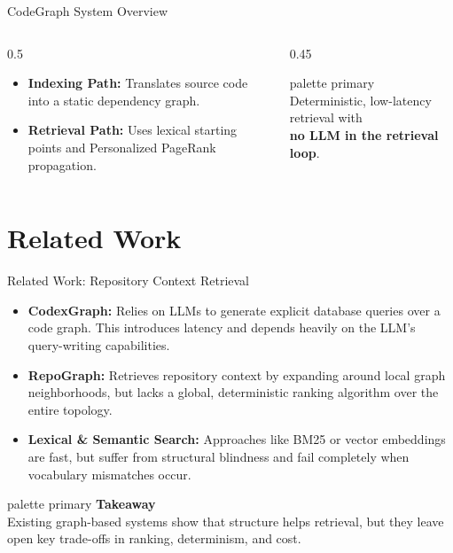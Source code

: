 \documentclass[aspectratio=169]{beamer}
\begin{document}
\begin{frame}{CodeGraph System Overview}
  \vspace{0.5cm}
  \begin{columns}[c]
    \begin{column}{0.5\textwidth}
      \begin{itemize}
        \item \textbf{Indexing Path:} Translates source code into a static dependency graph.
        \item \textbf{Retrieval Path:} Uses lexical starting points and Personalized PageRank propagation.
      \end{itemize}
    \end{column}
    \begin{column}{0.45\textwidth}
      \begin{beamercolorbox}[rounded=true, shadow=true, sep=6pt, center]{palette primary}
        Deterministic, low-latency retrieval with\\ \textbf{no LLM in the retrieval loop}.
      \end{beamercolorbox}
    \end{column}
  \end{columns}
\end{frame}



\section{Related Work}
\begin{frame}{Related Work: Repository Context Retrieval}
  \vspace{0.4cm}
  \begin{itemize}
    \setlength\itemsep{0.6em}
    \item \textbf{CodexGraph:} Relies on LLMs to generate explicit database queries over a code graph. This introduces latency and depends heavily on the LLM's query-writing capabilities.
    \item \textbf{RepoGraph:} Retrieves repository context by expanding around local graph neighborhoods, but lacks a global, deterministic ranking algorithm over the entire topology.
    \item \textbf{Lexical \& Semantic Search:} Approaches like BM25 or vector embeddings are fast, but suffer from structural blindness and fail completely when vocabulary mismatches occur.
  \end{itemize}

  \vspace{0.4cm}
  \centering
  \begin{beamercolorbox}[rounded=true, shadow=true, sep=8pt, center, wd=0.95\textwidth]{palette primary}
    \textbf{Takeaway}\\
    Existing graph-based systems show that structure helps retrieval, but they leave open key trade-offs in ranking, determinism, and cost.
  \end{beamercolorbox}
\end{frame}
\end{document}
